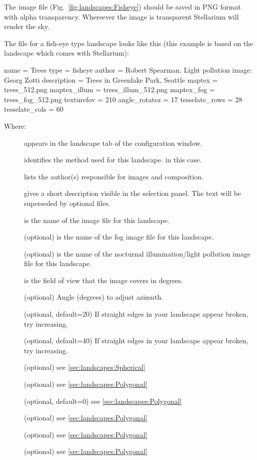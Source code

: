 The image file (Fig.~\ref{fig:landscapes:Fisheye}) should be saved in
PNG format with alpha transparency. Whereever the image is transparent
Stellarium will render the sky.

The  file for a fish-eye type landscape looks like
this (this example is based on the  landscape which
comes with Stellarium):

\begin{configfile}
[landscape]
name = Trees
type = fisheye
author = Robert Spearman. Light pollution image: Georg Zotti
description = Trees in Greenlake Park, Seattle
maptex = trees_512.png
maptex_illum = trees_illum_512.png
maptex_fog = trees_fog_512.png
texturefov = 210
angle_rotatez = 17
tesselate_rows = 28
tesselate_cols = 60
\end{configfile}
Where:
\begin{description}
\item[] appears in the landscape tab of the configuration window.
\item[] identifies the method used for this landscape.  in this case.
\item[] lists the author(s) responsible for images and composition.
\item[] gives a short description visible in the
  selection panel. The text will be superseded by optional
   files.
\item[] is the name of the image file for this landscape.
\item[] (optional) is the name of the fog image file for this landscape.
\item[] (optional) is the name of the nocturnal
  illumination/light pollution image file for this landscape.
\item[] is the field of view that the image covers in degrees.
\item[] (optional) Angle (degrees) to adjust azimuth.
\item[] (optional, default=20) If straight edges
  in your landscape appear broken, try increasing.
\item[] (optional, default=40) If straight edges
  in your landscape appear broken, try increasing.
\item[] (optional) see \ref{sec:landscapes:Spherical}
\item[] (optional) see \ref{sec:landscapes:Polygonal}
\item[] (optional, default=0) see \ref{sec:landscapes:Polygonal}
\item[] (optional) see \ref{sec:landscapes:Polygonal}
\item[] (optional)  see \ref{sec:landscapes:Polygonal}
\item[] (optional) see \ref{sec:landscapes:Polygonal}
\end{description}


